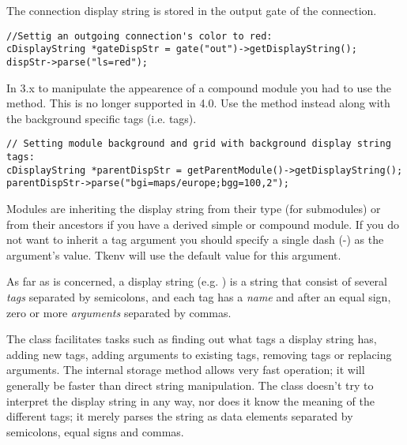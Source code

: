 \begin{note}
The connection display string is stored in the output gate of the connection.
\end{note}

\begin{verbatim}
//Settig an outgoing connection's color to red:
cDisplayString *gateDispStr = gate("out")->getDisplayString();
dispStr->parse("ls=red");
\end{verbatim}

\begin{note}
In {\opp} 3.x to manipulate the appearence of a compound module you had to use
the  method. This is no longer supported in 
{\opp} 4.0. Use the  method instead along with the background
specific tags (i.e.  tags).
\end{note}

\begin{verbatim}
// Setting module background and grid with background display string tags:
cDisplayString *parentDispStr = getParentModule()->getDisplayString();
parentDispStr->parse("bgi=maps/europe;bgg=100,2");
\end{verbatim}

\begin{note}
Modules are inheriting the display string from their type (for submodules) or
from their ancestors if you have a derived simple or compound module. If you
do not want to inherit a tag argument you should specify a single dash (-) 
as the argument's value. Tkenv will use the default value for this argument.
\end{note}

As far as  is concerned, a display string
(e.g. ) is a string that consist of several
\textit{tags} separated by semicolons, and each tag has a \textit{name}
and after an equal sign, zero or more \textit{arguments} separated by commas.

The class facilitates tasks such as finding out what tags a display string
has, adding new tags, adding arguments to existing tags,
removing tags or replacing arguments. The internal storage method allows
very fast operation; it will generally be faster than direct string manipulation.
The class doesn't try to interpret the display string in any way, nor does
it know the meaning of the different tags; it merely parses the string
as data elements separated by semicolons, equal signs and commas.

